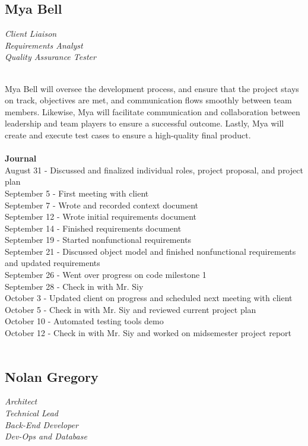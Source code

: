 \documentclass[oneside,openany,obeyspaces]{book}
\newcommand\tab[1][1cm]{\hspace*{#1}}
\begin{document}
\begin{flushleft}
    \subsection{Mya Bell}

    \textit{Client Liaison\\
        Requirements Analyst\\
        Quality Assurance Tester\\~\\}

    \tab Mya Bell will oversee the development process, and ensure that the project stays on track, objectives are met, and communication flows smoothly between team members. Likewise, Mya will facilitate communication and collaboration between leadership and team players to ensure a successful outcome. Lastly, Mya will create and execute test cases to ensure a high-quality final product.\\~\\

    \textbf{Journal\\}
    August 31 - Discussed and finalized individual roles, project proposal, and project plan\\
    September 5 - First meeting with client\\
    September 7 - Wrote and recorded context document\\
    September 12 - Wrote initial requirements document\\
    September 14 - Finished requirements document\\
    September 19 - Started nonfunctional requirements\\
    September 21 - Discussed object model and finished nonfunctional requirements and updated requirements\\
    September 26 - Went over progress on code milestone 1\\
    September 28 - Check in with Mr. Siy\\
    October 3 - Updated client on progress and scheduled next meeting with client\\
    October 5 - Check in with Mr. Siy and reviewed current project plan\\
    October 10 - Automated testing tools demo\\
    October 12 - Check in with Mr. Siy and worked on midsemester project report\\~\\

    \subsection{Nolan Gregory}
    \textit{Architect\\
        Technical Lead\\
        Back-End Developer\\
        Dev-Ops and Database\\~\\}


\end{flushleft}
\end{document}
